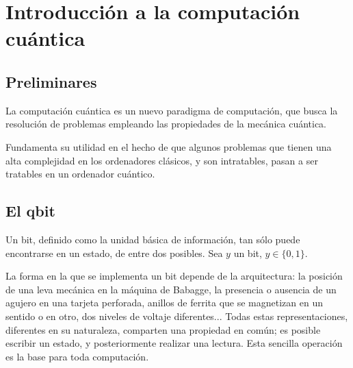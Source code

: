 \documentclass{article}
\theoremstyle{definition}
\begin{document}

\section{Introducción a la computación cuántica}
\subsection{Preliminares}
La computación cuántica es un nuevo paradigma de computación, que busca la
resolución de problemas empleando las propiedades de la mecánica cuántica.

Fundamenta su utilidad en el hecho de que algunos problemas que tienen una alta
complejidad en los ordenadores clásicos, y son intratables, pasan a ser
tratables en un ordenador cuántico.

\subsection{El qbit}
Un bit, definido como la unidad básica de información, tan sólo puede 
encontrarse en un estado, de entre dos posibles. Sea $y$ un bit, $y \in 
\{0,1\}$.

La forma en la que se implementa un bit depende de la arquitectura: la posición 
de una leva mecánica en la máquina de Babagge, la presencia o ausencia de un 
agujero en una tarjeta perforada, anillos de ferrita que se magnetizan en un 
sentido o en otro, dos niveles de voltaje diferentes...
Todas estas representaciones, diferentes en su naturaleza, comparten una 
propiedad en común; es posible escribir un estado, y posteriormente realizar una 
lectura. Esta sencilla operación es la base para toda computación.
\end{document}

